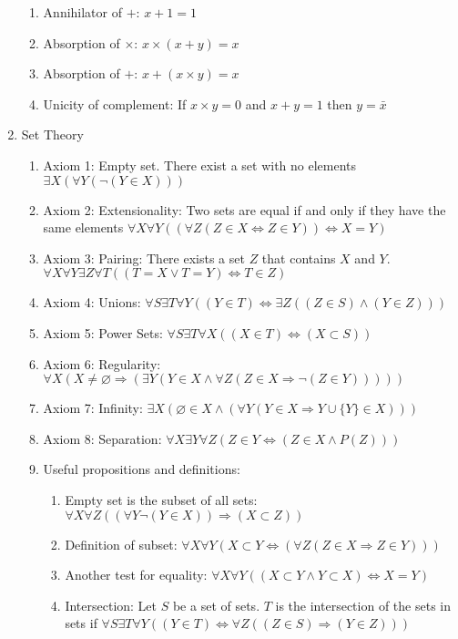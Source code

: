 \documentclass[11pt, twocolumn]{article}
\theoremstyle{definition} \newtheorem*{solution}{Solution}
\begin{document}
\begin{enumerate}
\begin{enumerate}
\item Annihilator of $+$: $x+1=1$
\item Absorption of $\times$: $x\times (x+y) = x$
\item Absorption of $+$: $x+(x\times y) =x$
\item Unicity of complement: If $x\times y = 0$ and $x+y=1$ then $y=\bar{x}$
\end{enumerate}
\item Set Theory
\begin{enumerate}
\item Axiom 1: Empty set. There exist a set with no elements $\exists X (\forall Y(\neg(Y\in X)))$
\item Axiom 2: Extensionality: Two sets are equal if and only if they have the same elements $\forall X\forall Y ((\forall Z(Z \in X \Leftrightarrow Z\in Y)) \Leftrightarrow X=Y)$
\item Axiom 3: Pairing: There exists a set $Z$ that contains $X$ and $Y$. $\forall X \forall Y \exists Z \forall T ((T=X\vee T=Y)\Leftrightarrow T\in Z)$
\item Axiom 4: Unions: $\forall S \exists T \forall Y ((Y\in T)\Leftrightarrow \exists Z((Z\in S)\wedge (Y\in Z)))$
\item Axiom 5: Power Sets: $\forall S \exists T \forall X (( X\in T) \Leftrightarrow (X\subset S))$
\item Axiom 6: Regularity: $\forall X (X \neq \varnothing \Rightarrow (\exists Y (Y \in X \wedge \forall Z (Z\in X \Rightarrow \neg (Z\in Y)))))$
\item Axiom 7: Infinity: $\exists X(\varnothing \in X \wedge (\forall Y (Y\in X \Rightarrow Y\cup \{ Y \} \in X )))$
\item Axiom 8: Separation: $ \forall X \exists Y \forall Z (Z\in Y \Leftrightarrow (Z\in X \wedge P(Z)))$
\item Useful propositions and definitions:
\begin{enumerate}
\item Empty set is the subset of all sets: $\forall X \forall Z ((\forall Y \neg(Y\in X)) \Rightarrow (X\subset Z))$
\item Definition of subset: $\forall X \forall Y (X\subset Y \Leftrightarrow (\forall Z (Z\in X \Rightarrow Z \in Y)))$
\item Another test for equality: $\forall X \forall Y ((X\subset Y \wedge Y\subset X)\Leftrightarrow X=Y)$
\item Intersection: Let $S$ be a set of sets. $T$ is the intersection of the sets in sets if $\forall S \exists T \forall Y ((Y\in T) \Leftrightarrow \forall Z ((Z\in S)\Rightarrow (Y\in Z)))$

\end{enumerate}
\end{enumerate}
\end{enumerate}
\end{document}
